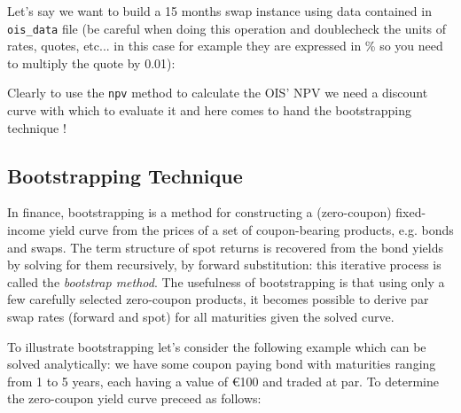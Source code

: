 Let's say we want to build a 15 months swap instance using data contained in \texttt{ois\_data} file (be careful when doing this operation and doublecheck the units of rates, quotes, etc... in this case for example they are expressed in \% so you need to multiply the quote by 0.01):

\begin{Shaded}
\begin{Highlighting}[]
\OperatorTok{=}\NormalTok{,}
\NormalTok{                         [date(}\NormalTok{, }\NormalTok{, }\NormalTok{), }
\NormalTok{, }\NormalTok{, }\NormalTok{), }
\NormalTok{, }\NormalTok{, }\NormalTok{)],                        }
\NormalTok{                         market_quotes[}\NormalTok{]}\OperatorTok{*} 
\NormalTok{                        )}
\NormalTok{ois.payment_dates[}\OperatorTok{-}\NormalTok{]}
\end{Highlighting}
\end{Shaded}

Clearly to use the \texttt{npv} method to calculate the OIS' NPV we need a discount curve with which to evaluate it and here comes to hand the bootstrapping technique !

\subsection{Bootstrapping Technique}\label{the-bootstrapping-technique}

In finance, bootstrapping is a method for constructing a (zero-coupon) fixed-income yield curve from the prices of a set of coupon-bearing products, e.g. bonds and swaps.
The term structure of spot returns is recovered from the bond yields by solving for them recursively, by forward substitution: this iterative process is called the \emph{bootstrap method}.
The usefulness of bootstrapping is that using only a few carefully selected zero-coupon products, it becomes possible to derive par swap rates (forward and spot) for all maturities given the solved curve.

To illustrate bootstrapping let's consider the following example which can be solved analytically: we have some coupon paying bond with maturities ranging from 1 to 5 years, each having a value of \euro{100} and traded at par. To determine the zero-coupon yield curve preceed as follows:

